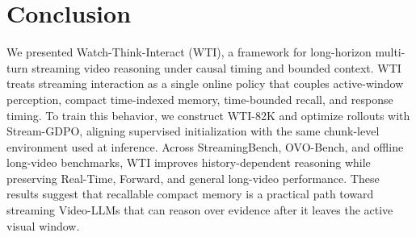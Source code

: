 \section{Conclusion}

We presented Watch-Think-Interact (WTI), a framework for long-horizon multi-turn streaming video reasoning under causal timing and bounded context.
WTI treats streaming interaction as a single online policy that couples active-window perception, compact time-indexed memory, time-bounded recall, and response timing.
To train this behavior, we construct WTI-82K and optimize rollouts with Stream-GDPO, aligning supervised initialization with the same chunk-level environment used at inference.
Across StreamingBench, OVO-Bench, and offline long-video benchmarks, WTI improves history-dependent reasoning while preserving Real-Time, Forward, and general long-video performance.
These results suggest that recallable compact memory is a practical path toward streaming Video-LLMs that can reason over evidence after it leaves the active visual window.
